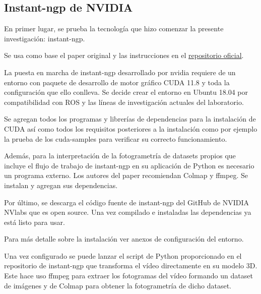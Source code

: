 \documentclass[a4paper, 12pt, spanish, twoside]{article}
\begin{document}



\subsection{Instant-ngp de NVIDIA} 

En primer lugar, se prueba la tecnología que hizo comenzar la presente investigación: \gls{instant-ngp}. 

Se usa como base el paper original y las instrucciones en el \href{https://github.com/NVlabs/instant-ngp}{repositorio oficial}.  

La puesta en marcha de \gls{instant-ngp} desarrollado por \gls{nvidia} requiere de un entorno con paquete de desarrollo de motor gráfico CUDA 11.8 y toda la configuración que ello conlleva. Se decide crear el entorno en Ubuntu 18.04 por compatibilidad con ROS y las líneas de investigación actuales del laboratorio. 

Se agregan todos los programas y librerías de dependencias para la instalación de CUDA así como todos los requisitos posteriores a la instalación como por ejemplo la prueba de los cuda-samples para verificar su correcto funcionamiento. 

Además, para la interpretación de la fotogrametría de datasets propios que incluye el flujo de trabajo de instant-ngp en su aplicación de Python es necesario un programa externo. Los autores del paper recomiendan Colmap y ffmpeg. Se instalan y agregan sus dependencias. 

Por último, se descarga el código fuente de instant-ngp del GitHub de NVIDIA NVlabs que es open source. Una vez compilado e instaladas las dependencias ya está listo para usar. 

Para más detalle sobre la instalación ver anexos de configuración del entorno. 

Una vez configurado se puede lanzar el script de Python proporcionado en el repositorio de instant-ngp que transforma el vídeo directamente en su modelo 3D. Este hace uso ffmpeg para extraer los fotogramas del vídeo formando un dataset de imágenes y de Colmap para obtener la fotogrametría de dicho dataset.  

\end{document}
